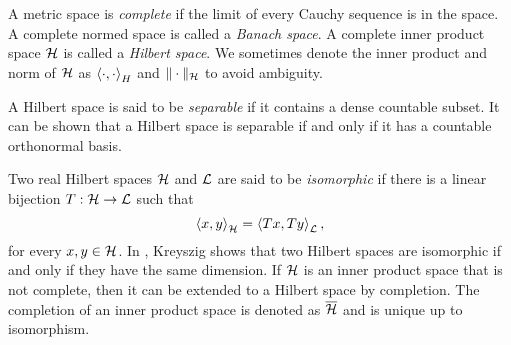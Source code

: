 A metric space is \textit{complete} if the limit of every Cauchy sequence is in the space.
A complete normed space is called a \textit{Banach space}.
A complete inner product space \(\mathcal{H}\) is called a \textit{Hilbert space}.
We sometimes denote the inner product and norm of \(\mathcal{H}\) as \(\left\langle \cdot, \cdot \right\rangle_H\) and \(\|\cdot\|_{\mathcal{H}}\) to avoid ambiguity.

A Hilbert space is said to be \textit{separable} if it contains a dense countable subset.
It can be shown that a Hilbert space is separable if and only if it has a countable orthonormal basis.

\def\L{\hilbert{L}}
Two real Hilbert spaces \(\mathcal{H}\) and \(\L\) are said to be \textit{isomorphic} if there is a linear bijection \(T : \H \to \L\) such that
\begin{equation}
    \label{eqn:hilbert-space-isomorphism}
    \ipt{x,y}_{\H} = \ipt{Tx, Ty}_{\L},
\end{equation}
for every \(x, y \in \mathcal{H}\).
In \cite{kreyszig1991introductory}, Kreyszig shows that two Hilbert spaces are isomorphic if and only if they have the same dimension.
If \(\mathcal{H}\) is an inner product space that is not complete, then it can be extended to a Hilbert space by completion.
The completion of an inner product space is denoted as \(\overline{\mathcal{H}}\) and is unique up to isomorphism.